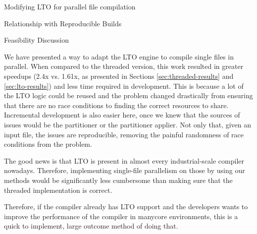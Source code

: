 \begin{section}{Modifying LTO for parallel file compilation}
\begin{subsection}{Relationship with Reproducible Builds}
\end{subsection}

\begin{subsection}{Feasibility Discussion}

We have presented a way to adapt the LTO engine to compile single files in
parallel. When compared to the threaded version, this work resulted in greater
speedups (2.4x vs. 1.61x, as presented in Sections \ref{sec:threaded-results}
and \ref{sec:lto-results}) and less time required in development. This is
because a lot of the LTO logic could be reused and the problem changed
drastically from ensuring that there are no race conditions to finding the
correct resources to share. Incremental development is also easier here, once
we knew that the sources of issues would be the partitioner or the partitioner
applier. Not only that, given an input file, the issues are reproducible,
removing the painful randomness of race conditions from the problem.

The good news is that LTO is present in almost every industrial-scale compiler
nowadays. Therefore, implementing single-file parallelism on those by using our
methods would be significantly less cumbersome than making sure that the
threaded implementation is correct.

Therefore, if the compiler already has LTO support and the developers wants
to improve the performance of the compiler in manycore environments, this is a
quick to implement, large outcome method of doing that.


\end{subsection}
\end{section}

%


